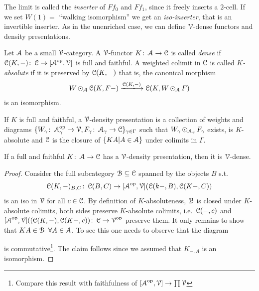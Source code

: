 \documentclass[a4paper,11pt,oneside,openany]{scrbook}
\begin{document}
The limit is called the \emph{inserter} of $Ff_0$ and $Ff_1$, since it freely inserts a $2$-cell. If we set $W(1)=$  ``walking isomorphism'' we get an \emph{iso-inserter}, that is an invertible inserter.
As in the unenriched case, we can define $\V$-dense functors and density presentations.
\begin{defn}
	Let $\A$ be a small $\V$-category. A $\V$-functor $K\from\A\to\C$ is called \emph{dense} if $\C(K,-)\from\C\to[\A^{\op},\V]$ is full and faithful. A weighted colimit in $\C$ is called \emph{$K$-absolute} if it is preserved by $\C(K,-)$ that is, the canonical morphism
	$$W\copw_{\A}\C(K,F-)\xlongrightarrow{\C(K,-)}\C(K,W\copw_{\A} F)$$
	is an isomorphism.
\end{defn}

\begin{defn}
	If $K$ is full and faithful, a $\V$-density presentation is a collection of weights and diagrams $\{W_\gamma\colon\A^{\op}_\gamma\to\V, F_\gamma\colon\A_\gamma\to\C\}_{\gamma\in\Gamma}$ such that $W_\gamma\copw_{\A_\gamma}F_\gamma$ exists, is $K$-absolute and $\C$ is the closure of $\{KA|A\in\A\}$ under colimits in $\Gamma$.
\end{defn}
\begin{prop}
	If a full and faithful $K\from\A\to\C$ has a $\V$-density presentation, then it is $\V$-dense.
\end{prop}
\begin{proof}
	Consider the full subcategory $\B\subseteq\C$ spanned by the objects $B$ s.t.\ $$\C(K,-)_{B,C}\colon\C(B,C)\to[\A^{\op},\V](\C(k-,B),\C(K-,C))$$ is an iso in $\V$ for all $c\in\C$. By definition of $K$-absoluteness, $\B$ is closed under $K$-absolute colimits, both sides preserve $K$-absolute colimits, i.e.\ $\C(-,c)$ and $[\A^{\op},\V]((\C(K,-),\C(K-,c))\colon\C\to\V^{\op}$ preserve them. It only remains to show that $KA\in\B\ \forall A\in\A$. To see this one needs to observe that the diagram
	\begin{center}
	\end{center}
	is commutative\footnote{Compare this result with faithfulness of $[\A^{\op},\V]\to\prod\V$ }. The claim follows since we assumed that $K_{-,A}$ is an isomorphism.
\end{proof}
\end{document}
